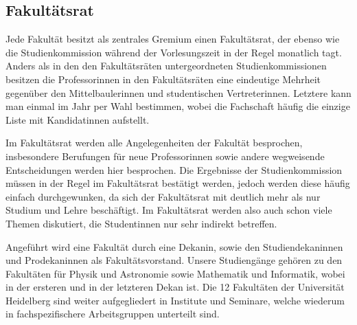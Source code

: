 \subsection{Fakultätsrat}
Jede Fakultät besitzt als zentrales Gremium einen Fakultätsrat, der ebenso wie die Studienkommission während der Vorlesungszeit in der Regel monatlich tagt. Anders als in den den Fakultätsräten untergeordneten Studienkommissionen besitzen die Professorinnen in den Fakultätsräten eine eindeutige Mehrheit gegenüber den Mittelbaulerinnen und studentischen Vertreterinnen. Letztere kann man einmal im Jahr per Wahl bestimmen, wobei die Fachschaft häufig die einzige Liste mit Kandidatinnen aufstellt.


Im Fakultätsrat werden alle Angelegenheiten der Fakultät besprochen, insbesondere Berufungen für neue Professorinnen sowie andere wegweisende Entscheidungen werden hier besprochen. Die Ergebnisse der Studienkommission müssen in der Regel im Fakultätsrat bestätigt werden, jedoch werden diese häufig einfach durchgewunken, da sich der Fakultätsrat mit deutlich mehr als nur Studium und Lehre beschäftigt. Im Fakultätsrat werden also auch schon viele Themen diskutiert, die Studentinnen nur sehr indirekt betreffen.

Angeführt wird eine Fakultät durch eine Dekanin, sowie den Studiendekaninnen und Prodekaninnen als Fakultätsvorstand. Unsere Studiengänge gehören zu den Fakultäten für Physik und Astronomie sowie Mathematik und Informatik, wobei \dekanphysik in der ersteren und \dekanmathe in der letzteren Dekan ist. Die 12 Fakultäten der Universität Heidelberg sind weiter aufgegliedert in Institute und Seminare, welche wiederum in fachspezifischere Arbeitsgruppen unterteilt sind. 

